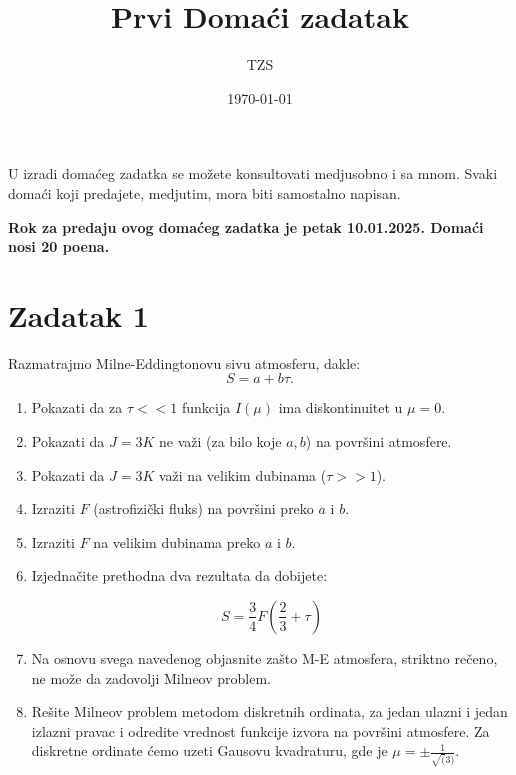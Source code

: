 \documentclass[12pt]{article}
\title{Prvi Doma\'{c}i zadatak}
\author{TZS}
\date{\today}
\begin{document}
\maketitle

U izradi doma\'{c}eg zadatka se mo\v{z}ete konsultovati medjusobno i sa mnom. Svaki doma\'{c}i koji predajete, medjutim, mora biti samostalno napisan. 

\textbf{Rok za predaju ovog doma\'{c}eg zadatka je petak 10.01.2025. Doma\'{c}i nosi 20 poena.}

\section*{Zadatak 1}

Razmatrajmo Milne-Eddingtonovu sivu atmosferu, dakle: 
\begin{equation}
S = a + b\tau.
\end{equation}
\begin{enumerate}
    \item Pokazati da za $\tau<<1$ funkcija $I(\mu)$ ima diskontinuitet u $\mu=0$. 

    \item Pokazati da $J = 3K$ ne va\v{z}i (za bilo koje $a,b$) na povr\v{s}ini atmosfere. 

    \item Pokazati da $J=3K$ va\v{z}i na velikim dubinama ($\tau >> 1$).

    \item Izraziti $F$ (astrofizi\v{c}ki fluks) na povr\v{s}ini preko $a$ i $b$. 

    \item Izraziti $F$ na velikim dubinama preko $a$ i $b$. 

    \item Izjedna\v{c}ite prethodna dva rezultata da dobijete: 

    \begin{equation}
    S = \frac{3}{4}F (\frac{2}{3} + \tau)
    \end{equation}

    \item Na osnovu svega navedenog objasnite za\v{s}to M-E atmosfera, striktno re\v{c}eno, ne mo\v{z}e da zadovolji Milneov problem. 

    \item Re\v{s}ite Milneov problem metodom diskretnih ordinata, za jedan ulazni i jedan izlazni pravac i odredite vrednost funkcije izvora na povr\v{s}ini atmosfere. Za diskretne ordinate \'{c}emo uzeti Gausovu kvadraturu, gde je $\mu = \pm \frac{1}{\sqrt(3)}$.
\end{enumerate}
\end{document}
